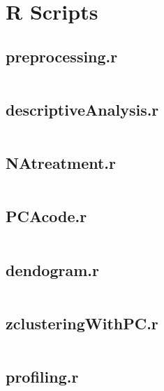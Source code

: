 

\section{R Scripts}%
\label{sec:r_scripts}

\newcommand{\mintedfile}[1]{
    \subsection{#1}%
    \label{sub:#1}
    \inputminted{r}{../../analysis/#1}
    \pagebreak
}


\mintedfile{preprocessing.r}
\mintedfile{descriptiveAnalysis.r}
\mintedfile{NAtreatment.r}
\mintedfile{PCAcode.r}
\mintedfile{dendogram.r}
\mintedfile{zclusteringWithPC.r}
\mintedfile{profiling.r}
